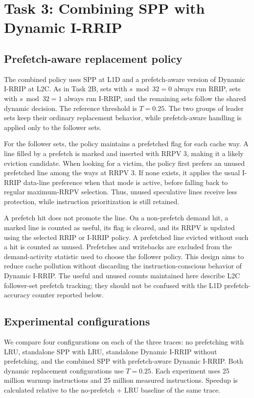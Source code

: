 \section{Task 3: Combining SPP with Dynamic I-RRIP}
\label{sec:task3}

\subsection{Prefetch-aware replacement policy}
The combined policy uses SPP at L1D and a prefetch-aware version of Dynamic I-RRIP at L2C. As in Task 2B, sets with $s\bmod 32=0$ always run RRIP, sets with $s\bmod 32=1$ always run I-RRIP, and the remaining sets follow the shared dynamic decision. The reference threshold is $T=0.25$. The two groups of leader sets keep their ordinary replacement behavior, while prefetch-aware handling is applied only to the follower sets.

For the follower sets, the policy maintains a prefetched flag for each cache way. A line filled by a prefetch is marked and inserted with RRPV 3, making it a likely eviction candidate. When looking for a victim, the policy first prefers an unused prefetched line among the ways at RRPV 3. If none exists, it applies the usual I-RRIP data-line preference when that mode is active, before falling back to regular maximum-RRPV selection. Thus, unused speculative lines receive less protection, while instruction prioritization is still retained.

A prefetch hit does not promote the line. On a non-prefetch demand hit, a marked line is counted as useful, its flag is cleared, and its RRPV is updated using the selected RRIP or I-RRIP policy. A prefetched line evicted without such a hit is counted as unused. Prefetches and writebacks are excluded from the demand-activity statistic used to choose the follower policy. This design aims to reduce cache pollution without discarding the instruction-conscious behavior of Dynamic I-RRIP. The useful and unused counts maintained here describe L2C follower-set prefetch tracking; they should not be confused with the L1D prefetch-accuracy counter reported below.

\subsection{Experimental configurations}
We compare four configurations on each of the three traces: no prefetching with LRU, standalone SPP with LRU, standalone Dynamic I-RRIP without prefetching, and the combined SPP with prefetch-aware Dynamic I-RRIP. Both dynamic replacement configurations use $T=0.25$. Each experiment uses 25 million warmup instructions and 25 million measured instructions. Speedup is calculated relative to the no-prefetch + LRU baseline of the same trace.


